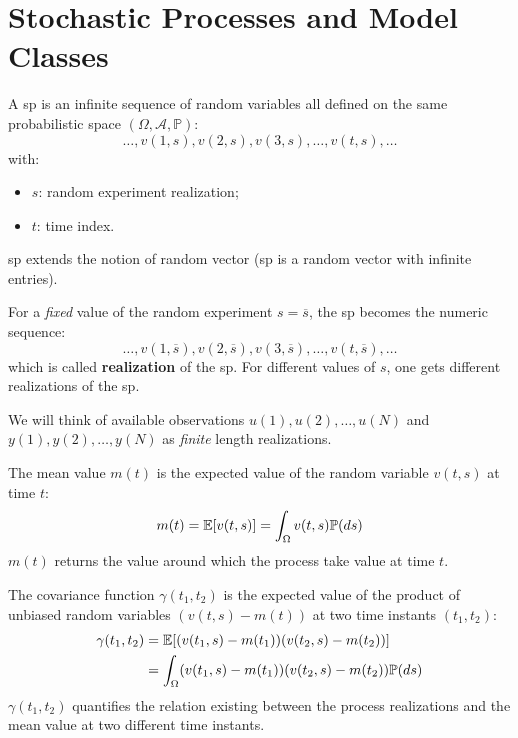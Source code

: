 \chapter{Stochastic Processes and Model Classes}
A \gls{sp} is an infinite sequence of random variables all defined on the same probabilistic space $(\Omega,\mathcal{A},\mathbb{P})$:
\[
	\ldots,v(1,s),v(2,s),v(3,s),\ldots,v(t,s),\ldots
\]
with:
\begin{itemize}
 	\item $s$: random experiment realization;
 	\item $t$: time index.
 \end{itemize}

\begin{rem}
	\gls{sp} extends the notion of random vector (\gls{sp} is a random vector with infinite entries).
\end{rem}

\begin{rem}
For a \emph{fixed} value of the random experiment $s = \overline{s}$, the \gls{sp} becomes the numeric sequence:
\[
	\ldots,v(1,\overline{s}),v(2,\overline{s}),v(3,\overline{s}),\ldots,v(t,\overline{s}),\ldots
\]
which is called \textbf{realization} of the \gls{sp}.
For different values of $s$, one gets different realizations of the \gls{sp}.
\end{rem}

We will think of available observations ${u(1),u(2),\ldots,u(N)}$ and ${y(1), y(2),\ldots, y(N)}$ as \emph{finite} length realizations.

\begin{defn}
	The mean value $m(t)$ is the expected value of the random variable $v(t,s)$ at time $t$:
	\[
		m(t)=\mathbb{E}[v(t, s)]=\int_{\Omega} v(t, s) \mathbb{P}(ds)
	\]
	$m(t)$ returns the value around which the process take value at time $t$.
\end{defn}

\begin{defn}
	The covariance function $\gamma(t_{1}, t_{2})$ is the expected value of the product of unbiased random variables $(v(t, s)-m(t))$ at two time instants $(t_{1}, t_{2})$:
	\begin{align*}
		\gamma(t_{1}, t_{2}) &=\mathbb{E}[(v(t_{1}, s)-m(t_{1}))(v(t_{2}, s)-m(t_{2}))] \\
		&=\int_{\Omega}(v(t_{1}, s)-m(t_{1}))(v(t_{2}, s)-m(t_{2})) \mathbb{P}(ds)
	\end{align*}
	$\gamma(t_{1}, t_{2})$ quantifies the relation existing between the process realizations and the mean value at two different time instants.
\end{defn}

